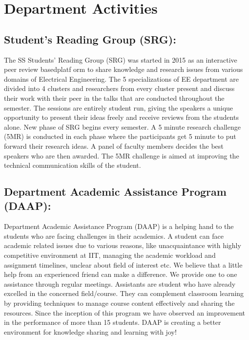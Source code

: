 \documentclass[openany]{book} %
\begin{document}



\chapter{Department Activities}
\section {Student's Reading Group (SRG):}
The SS Students’ Reading Group (SRG) was started in 2015 as an interactive peer review basedplatf orm to share knowledge and research issues from various domains of Electrical Engineering. The 5 specializations of EE department are divided into 4 clusters and researchers from every cluster present and discuss their work with their peer in the talks that are conducted throughout the semester. The sessions are entirely student run, giving the speakers a unique opportunity to present their ideas freely and receive reviews from the students alone.\newline
New phase of SRG begins every semester. A 5 minute research challenge (5MR) is conducted in each phase where the participants get 5 minute to put forward their research ideas. A panel of faculty members decides the best speakers who are then awarded. The 5MR challenge is aimed
at improving the technical communication skills of the student.
\section {Department Academic Assistance Program (DAAP):}
Department Academic Assistance Program (DAAP) is a helping hand to the students who are facing challenges in their academics. A student can face academic related issues due to various reasons, like unacquaintance with highly competitive environment at IIT, managing the academic
workload and assignment timelines, unclear about field of interest etc. We believe that a little help from an experienced friend can make a difference. We provide one to one assistance through regular meetings. Assistants are student who have already excelled in the concerned field/course. They can complement classroom learning by providing techniques to manage course content effectively and sharing the resources. Since the inception of this program we have observed an improvement in the performance of more than 15 students. DAAP is creating a better environment for knowledge sharing and learning with joy!
\newline
\end{document}
